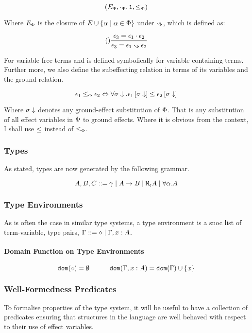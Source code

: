 \documentclass{Report}
\begin{document}
\begin{equation}
    (E_\P, \dotp, \1, \subeffectp)
\end{equation}

Where $E_\P$ is the closure of $E\cup \left\{\a\mid\a\in\P\right\}$ under $\dotp$, which is defined as:

\begin{equation}
    \treerule{}{\e_3 = \e_1\dot\e_2}{\e_3 = \e_1\dotp\e_2}
\end{equation} 

For variable-free terms and is defined symbolically for variable-containing terms. Further more, we also define the subeffecting relation in terms of its variables and the ground relation.

\begin{equation}
    \e_1 \subeffectp \e_2 \Leftrightarrow \forall \si\downarrow. \e_1\sub{\si\downarrow} \subeffect \e_2\sub{\si\downarrow}
\end{equation}

Where $\si\downarrow$ denotes any ground-effect substitution of $\P$. That is any substitution of all effect variables in $\P$ to ground effects. Where it is obvious from the context, I shall use $\subeffect$ instead of $\subeffectp$.


\subsubsection{Types}
As stated, types are now generated by the following grammar.

$$ A, B, C \gens \ground \mid \ab \mid \mea \mid \all{\a}{A}$$
  
\subsubsection{Type Environments}
As is often the case in similar type systems, a type environment is a snoc list of term-variable, type pairs, $\G \gens \nil \mid \gax$.

\paragraph{Domain Function on Type Environments}

\[
    \dom{\nil} = \emptyset
    \quad\quad\quad
    \dom{\gax} =  \dom{\G}  \cup \left\{x \right\}
\]

\subsubsection{Well-Formedness Predicates}
To formalise properties of the type system, it will be useful to have a collection of predicates ensuring that structures in the language are well behaved with respect to their use of effect variables.
\end{document}
